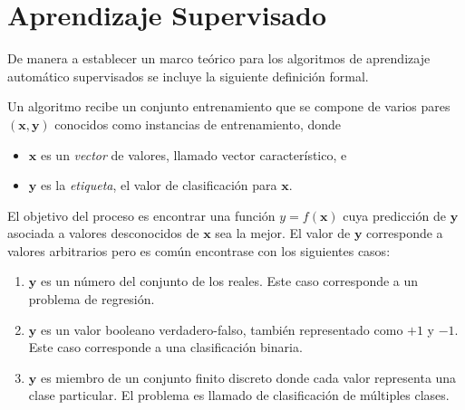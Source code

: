 \section{Aprendizaje Supervisado}

\label{sec3:aprendizaje}De manera a establecer un marco teórico para los algoritmos de aprendizaje automático supervisados \cite{Rajaraman2011} se incluye la siguiente definición formal.

\begin{definition}\label{def3:clasificacion}Un algoritmo  recibe un conjunto entrenamiento que se compone de varios pares $(\boldsymbol{x},\boldsymbol{y})$ conocidos como instancias de entrenamiento, donde
\begin{itemize}
\item $\boldsymbol{x}$ es un \emph{vector} de valores, llamado vector característico, e
\item $\boldsymbol{y}$ es la \emph{etiqueta}, el valor de clasificación para $\boldsymbol{x}$.
\end{itemize}
El objetivo del proceso  es encontrar una función $y=f(\boldsymbol{x})$ cuya predicción de $\boldsymbol{y}$ asociada a valores desconocidos de $\boldsymbol{x}$ sea la mejor. El valor de $\boldsymbol{y}$ corresponde a valores arbitrarios pero es común encontrase con los siguientes casos:
\begin{enumerate}
\item $\boldsymbol{y}$ es un número del conjunto de los reales. Este caso corresponde a un problema de regresión.
\item $\boldsymbol{y}$ es un valor booleano verdadero-falso, también representado como $+1$ y $-1$. Este caso corresponde a una clasificación binaria. 
\item $\boldsymbol{y}$ es miembro de un conjunto finito discreto donde cada valor representa una clase particular. El problema es llamado de clasificación de múltiples clases.
\end{enumerate}
\end{definition}

